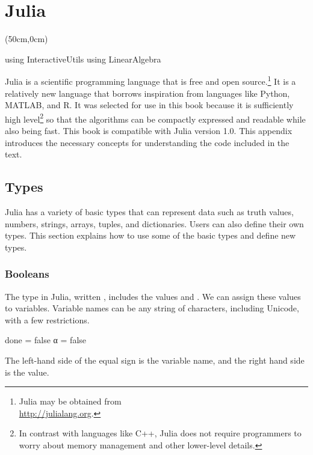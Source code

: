 \chapter{Julia}
\label{ch:julia}

\begin{textblock*}{\textwidth}(50cm,0cm)
	\begin{juliaconsole}
		using InteractiveUtils
		using LinearAlgebra
	\end{juliaconsole}
\end{textblock*}

Julia is a scientific programming language that is free and open source.\footnote{Julia may be obtained from\\ \url{http://julialang.org}.} It is a relatively new language that borrows inspiration from languages like Python, MATLAB, and R. It was selected for use in this book because it is sufficiently high level\footnote{In contrast with languages like C++, Julia does not require programmers to worry about memory management and other lower-level details.} so that the algorithms can be compactly expressed and readable while also being fast.
This book is compatible with Julia version 1.0.
This appendix introduces the necessary concepts for understanding the code included in the text.

\section{Types}

Julia has a variety of basic types that can represent data such as truth values, numbers, strings, arrays, tuples, and dictionaries.
Users can also define their own types. This section explains how to use some of the basic types and define new types.

\subsection{Booleans}

The  type in Julia, written , includes the values  and . We can assign these values to variables.  Variable names can be any string of characters, including Unicode, with a few restrictions.
\begin{juliaverbatim}
done = false
α = false
\end{juliaverbatim}
The left-hand side of the equal sign is the variable name, and the right hand side is the value.

